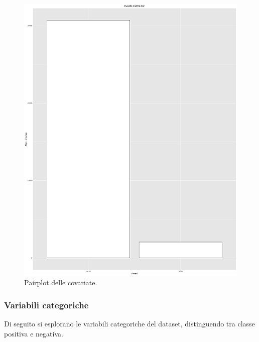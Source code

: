 \begin{figure}[H]
	\hspace*{-1.5cm}   
	\centering
	\includegraphics[width=23cm, angle=270]{../images/pairplot.png}
	\caption{Pairplot delle covariate.}
	\label{fig:pairplot}
\end{figure}

\subsubsection{Variabili categoriche}
Di seguito si esplorano le variabili categoriche del dataset,
distinguendo tra classe positiva e negativa.

